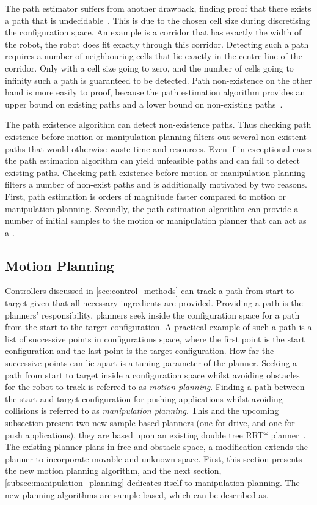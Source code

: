 The path estimator suffers from another drawback, finding proof that there exists a path that is undecidable~\cite{zhang_simple_2008}. This is due to the chosen cell size during discretising the configuration space. An example is a corridor that has exactly the width of the robot, the robot does fit exactly through this corridor. Detecting such a path requires a number of neighbouring cells that lie exactly in the centre line of the corridor. Only with a cell size going to zero, and the number of cells going to infinity such a path is guaranteed to be detected. Path non-existence on the other hand is more easily to proof, because the path estimation algorithm provides an upper bound on existing paths and a lower bound on non-existing paths~\cite{zhang_simple_2008}.\bs

The path existence algorithm can detect non-existence paths. Thus checking path existence before motion or manipulation planning filters out several non-existent paths that would otherwise waste time and resources. Even if in exceptional cases the path estimation algorithm can yield unfeasible paths and can fail to detect existing paths. Checking path existence before motion or manipulation planning filters a number of non-exist paths and is additionally motivated by two reasons. First, path estimation is orders of magnitude faster compared to motion or manipulation planning. Secondly, the path estimation algorithm can provide a number of initial samples to the motion or manipulation planner that can act as a .

\subsection{Motion Planning}%
\label{subsec:motion_planning}
Controllers discussed in \cref{sec:control_methods} can track a path from start to target given that all necessary ingredients are provided. Providing a path is the planners' responsibility, planners seek inside the configuration space for a path from the start to the target configuration. A practical example of such a path is a list of successive points in configurations space, where the first point is the start configuration and the last point is the target configuration. How far the successive points can lie apart is a tuning parameter of the planner. Seeking a path from start to target inside a configuration space whilst avoiding obstacles for the robot to track is referred to as \textit{motion planning}. Finding a path between the start and target configuration for pushing applications whilst avoiding collisions is referred to as \textit{manipulation planning}. This and the upcoming subsection present two new sample-based planners (one for drive, and one for push applications), they are based upon an existing double tree \ac{RRT*} planner~\cite{chen_fast_2018}. The existing planner plans in free and obstacle space, a modification extends the planner to incorporate movable and unknown space. First, this section presents the new motion planning algorithm, and the next section, \cref{subsec:manipulation_planning} dedicates itself to manipulation planning. The new planning algorithms are sample-based, which can be described as.\bs

